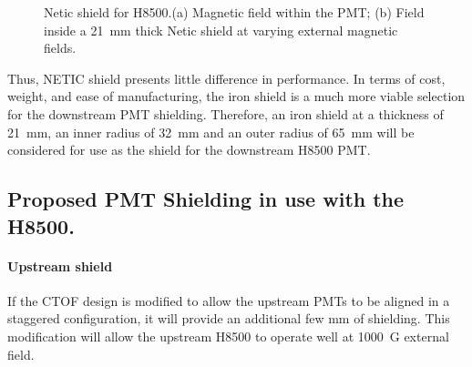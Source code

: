 \documentclass[12pt]{article}
\begin{document}
\begin{figure}[ht]
\centering
{}
\qquad
{}
\caption{\small{Netic shield for H8500.(a) Magnetic field within the PMT;
 (b) Field inside  a 21~mm thick Netic shield at varying external 
magnetic fields.}}
\label{Upstream_NETIC_21mm}
\end{figure}
Thus, NETIC shield presents little difference
in performance. In terms of cost, weight, and ease of manufacturing, 
the iron shield is a much more viable selection for the downstream PMT shielding. 
Therefore, an iron shield at a thickness
of 21~mm, an inner radius of 32~mm and an outer radius of 65~mm will be 
considered for use as 
the shield for the downstream H8500 PMT.
\clearpage
\subsection{Proposed PMT Shielding  in use with the H8500.}%

\paragraph{Upstream shield}
If the CTOF design is modified to allow 
the upstream PMTs to be aligned in a staggered configuration, 
it will provide an additional few mm of shielding. 
This modification will allow the upstream H8500 to operate well at
1000~G external field. 
\end{document}
